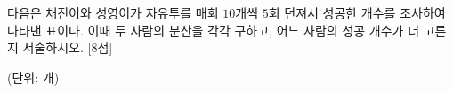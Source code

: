 다음은 채진이와 성영이가 자유투를 매회 $10$개씩 $5$회 던져서 성공한 개수를 조사하여 나타낸 표이다. 이때 두 사람의 분산을 각각 구하고, 어느 사람의 성공 개수가 더 고른지 서술하시오. \mbox{[8점]}\par\noindent\hfill{\footnotesize (단위: 개)}\par\smallskip{}
